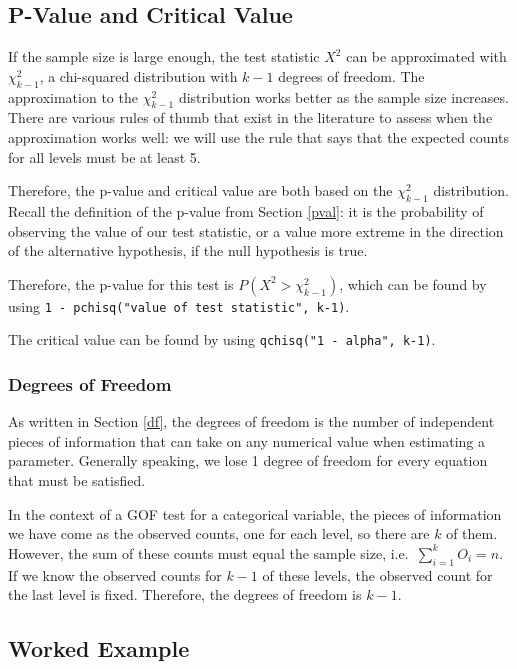 \documentclass[
]{book}
\theoremstyle{definition}
\theoremstyle{definition}
\theoremstyle{definition}
\theoremstyle{definition}
\theoremstyle{remark}
\begin{document}
\hypertarget{p-value-and-critical-value}{%
\subsection{P-Value and Critical Value}\label{p-value-and-critical-value}}

If the sample size is large enough, the test statistic \(X^2\) can be approximated with \(\chi^2_{k-1}\), a chi-squared distribution with \(k-1\) degrees of freedom. The approximation to the \(\chi^2_{k-1}\) distribution works better as the sample size increases. There are various rules of thumb that exist in the literature to assess when the approximation works well: we will use the rule that says that the expected counts for all levels must be at least 5.

Therefore, the p-value and critical value are both based on the \(\chi^2_{k-1}\) distribution. Recall the definition of the p-value from Section \ref{pval}: it is the probability of observing the value of our test statistic, or a value more extreme in the direction of the alternative hypothesis, if the null hypothesis is true.

Therefore, the p-value for this test is \(P(X^2 > \chi^2_{k-1})\), which can be found by using \texttt{1\ -\ pchisq("value\ of\ test\ statistic",\ k-1)}.

The critical value can be found by using \texttt{qchisq("1\ -\ alpha",\ k-1)}.

\hypertarget{degrees-of-freedom}{%
\subsubsection{Degrees of Freedom}\label{degrees-of-freedom}}

As written in Section \ref{df}, the degrees of freedom is the number of independent pieces of information that can take on any numerical value when estimating a parameter. Generally speaking, we lose 1 degree of freedom for every equation that must be satisfied.

In the context of a GOF test for a categorical variable, the pieces of information we have come as the observed counts, one for each level, so there are \(k\) of them. However, the sum of these counts must equal the sample size, i.e.~\(\sum_{i=1}^k O_i = n\). If we know the observed counts for \(k-1\) of these levels, the observed count for the last level is fixed. Therefore, the degrees of freedom is \(k-1\).

\hypertarget{worked-example-7}{%
\subsection{Worked Example}\label{worked-example-7}}
\end{document}
